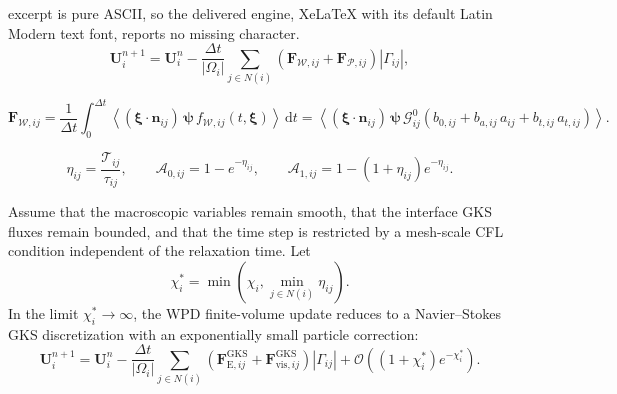 \documentclass[10pt,a4paper]{amsart}
\begin{document}
excerpt is pure ASCII, so the delivered engine, XeLaTeX with its default Latin Modern text font, reports no missing character.
\begin{equation}\label{eq:fv_update_total}
    \mathbf U_i^{n+1}
    =
    \mathbf U_i^n
    -
    \frac{\Delta t}{|\Omega_i|}
    \sum_{j\in N(i)}
    \left(
    \mathbf F_{\mathcal{W},ij}
    +
    \mathbf F_{\mathcal{P},ij}
    \right)|\Gamma_{ij}|,
\end{equation}

\begin{equation}\label{eq:wave_flux_algorithm}
    \mathbf F_{\mathcal{W},ij}
    =
    \frac{1}{\Delta t}\int_0^{\Delta t}
    \left\langle (\boldsymbol{\xi}\cdot\boldsymbol{n}_{ij})\,\boldsymbol{\psi}\,f_{\mathcal{W},ij}(t,\boldsymbol{\xi}) \right\rangle\,\mathrm{d} t
    =
    \left\langle (\boldsymbol{\xi}\cdot\boldsymbol{n}_{ij})\,\boldsymbol{\psi}\,
    \mathcal{G}_{ij}^{0}\left(
    b_{0,ij}+b_{a,ij}\,a_{ij}+b_{t,ij}\,a_{t,ij}
    \right) \right\rangle .
\end{equation}

\begin{equation}\label{eq:algorithm_A01}
    \eta_{ij}=\frac{\mathcal{T}_{ij}}{\tau_{ij}},\qquad
    \mathcal A_{0,ij}=1-e^{-\eta_{ij}},\qquad
    \mathcal A_{1,ij}=1-(1+\eta_{ij})e^{-\eta_{ij}} .
\end{equation}

\begin{theorem}\label{thm:ap}
Assume that the macroscopic variables remain smooth, that the interface GKS fluxes remain bounded, and that the time step is restricted by a mesh-scale CFL condition independent of the relaxation time. Let
\[
    \chi_i^\ast=\min\left(\chi_i,\min_{j\in N(i)}\eta_{ij}\right).
\]
In the limit $\chi_i^\ast\to\infty$, the WPD finite-volume update reduces to a Navier--Stokes GKS discretization with an exponentially small particle correction:
\begin{equation}\label{eq:ap_limit_update}
    \mathbf U_i^{n+1}
    =
    \mathbf U_i^n
    -
    \frac{\Delta t}{|\Omega_i|}
    \sum_{j\in N(i)}
    \left(
    \mathbf F_{\mathrm E,ij}^{\mathrm{GKS}}
    +
    \mathbf F_{\mathrm{vis},ij}^{\mathrm{GKS}}
    \right)|\Gamma_{ij}|
    +
    \mathcal O\!\left((1+\chi_i^\ast)e^{-\chi_i^\ast}\right) .
\end{equation}
\end{theorem}
\end{document}
